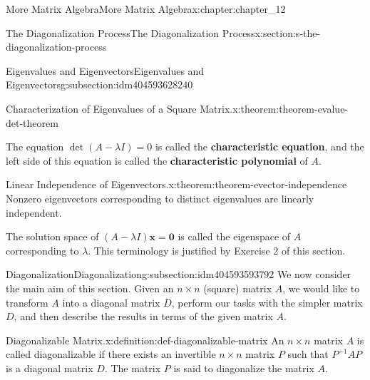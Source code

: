 \documentclass[twoside,10pt,]{book}
\newcommand{\xreffont}{\relax}
\newcommand{\terminology}[1]{\textbf{#1}}
\numberwithin{equation}{section}
\renewcommand{\vec}[1]{\mathbf{#1}}
\begin{document}
\begin{chapterptx}{More Matrix Algebra}{}{More Matrix Algebra}{}{}{x:chapter:chapter_12}
\begin{sectionptx}{The Diagonalization Process}{}{The Diagonalization Process}{}{}{x:section:s-the-diagonalization-process}
\begin{subsectionptx}{Eigenvalues and Eigenvectors}{}{Eigenvalues and Eigenvectors}{}{}{g:subsection:idm404593628240}
\begin{theorem}{Characterization of Eigenvalues of a Square Matrix.}{}{x:theorem:theorem-evalue-det-theorem}
\end{theorem}
The equation \(\det (A - \lambda  I) = 0\) is called the \terminology{characteristic equation}, and the left side of this equation is called the \terminology{characteristic polynomial} of \(A\).%
\begin{theorem}{Linear Independence of Eigenvectors.}{}{x:theorem:theorem-evector-independence}%
Nonzero eigenvectors corresponding to distinct eigenvalues are linearly independent.%
\end{theorem}
The solution space of \((A-\lambda  I)\vec{x}=\vec{0}\) is called the eigenspace of \(A\) corresponding to \(\lambda\). This terminology is justified by Exercise 2 of this section.%
\end{subsectionptx}
%
%
\typeout{************************************************}
\typeout{************************************************}
%
\begin{subsectionptx}{Diagonalization}{}{Diagonalization}{}{}{g:subsection:idm404593593792}
We now consider the main aim of this section. Given an \(n\times n\) (square) matrix \(A\), we would like to transform \(A\) into a diagonal matrix \(D\), perform our tasks with the simpler matrix \(D\), and then describe the results in terms of the given matrix \(A\).%
\begin{definition}{Diagonalizable Matrix.}{x:definition:def-diagonalizable-matrix}%
%
An \(n\times n\) matrix \(A\) is called diagonalizable if there exists an invertible \(n\times n\) matrix \(P\) such that \(P^{-1} A P\) is a diagonal matrix \(D\). The matrix \(P\) is said to diagonalize the matrix \(A\).%
\end{definition}
\end{subsectionptx}
\end{sectionptx}
\end{chapterptx}
\end{document}

